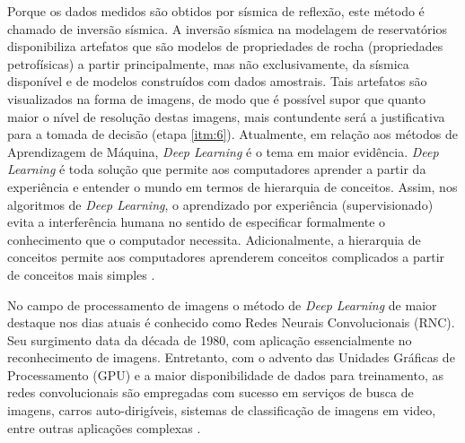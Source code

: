 Porque os dados medidos são obtidos por sísmica de reflexão,
este método é chamado de inversão sísmica. A inversão sísmica na
modelagem de reservatórios disponibiliza artefatos que são modelos de propriedades de rocha
(propriedades petrofísicas) a partir principalmente, mas não exclusivamente,
da sísmica disponível e de modelos construídos com dados amostrais. Tais artefatos
são visualizados na forma de imagens, de modo que é possível supor que quanto maior
o nível de resolução destas imagens, mais contundente será a justificativa para a tomada de decisão
(etapa \ref{itm:6}).
%
Atualmente, em relação aos métodos de Aprendizagem de Máquina, \textit{Deep Learning} é o tema em
maior evidência. \textit{Deep Learning} é toda solução que permite aos
computadores aprender a partir da experiência e entender o mundo em
termos de hierarquia de conceitos.
Assim, nos algoritmos de \textit{Deep Learning}, o aprendizado
por experiência (supervisionado) evita a interferência
humana no sentido de especificar formalmente o conhecimento que o computador necessita.
Adicionalmente, a hierarquia de conceitos permite aos computadores aprenderem
conceitos complicados a partir de conceitos mais simples \citep{Gdfl16}.

No campo de
processamento de imagens o método de \textit{Deep Learning} de
maior destaque nos dias atuais é conhecido
como Redes Neurais Convolucionais (RNC). Seu surgimento
data da década de 1980, com aplicação essencialmente no reconhecimento de imagens.
Entretanto, com o advento das Unidades Gráficas de Processamento (GPU) e a maior
disponibilidade de dados para treinamento, as redes convolucionais
são empregadas com sucesso em serviços de busca de imagens, carros auto-dirigíveis,
sistemas de classificação de imagens em video, entre outras aplicações complexas \citep[p. 50]{Buduma15}.

